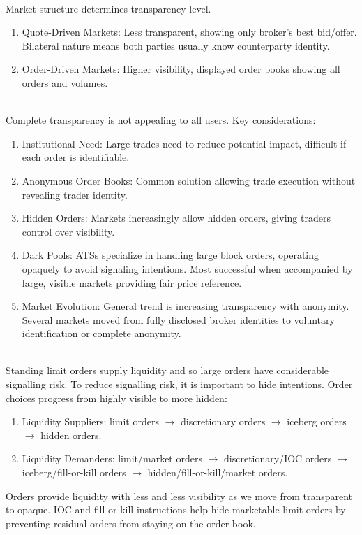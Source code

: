 \begin{remark} \\
Market structure determines transparency level.
\begin{enumerate}[label=\roman*.]
\setlength{\itemsep}{0pt}
\item Quote-Driven Markets: Less transparent, showing only broker's best bid/offer. Bilateral nature means both parties usually know counterparty identity.
\item Order-Driven Markets: Higher visibility, displayed order books showing all orders and volumes.
\end{enumerate}
\end{remark}

\begin{remark} \\
Complete transparency is not appealing to all users. Key considerations:
\begin{enumerate}[label=\roman*.]
\setlength{\itemsep}{0pt}
\item Institutional Need: Large trades need to reduce potential impact, difficult if each order is identifiable.
\item Anonymous Order Books: Common solution allowing trade execution without revealing trader identity.
\item Hidden Orders: Markets increasingly allow hidden orders, giving traders control over visibility.
\item Dark Pools: ATSs specialize in handling large block orders, operating opaquely to avoid signaling intentions. Most successful when accompanied by large, visible markets providing fair price reference.
\item Market Evolution: General trend is increasing transparency with anonymity. Several markets moved from fully disclosed broker identities to voluntary identification or complete anonymity.
\end{enumerate}
\end{remark}

\begin{remark} \\
Standing limit orders supply liquidity and so large orders have considerable signalling risk. To reduce signalling risk, it is important to hide intentions. Order choices progress from highly visible to more hidden:
\begin{enumerate}[label=\roman*.]
\setlength{\itemsep}{0pt}
\item Liquidity Suppliers: limit orders $\to$ discretionary orders $\to$ iceberg orders $\to$ hidden orders.
\item Liquidity Demanders: limit/market orders $\to$ discretionary/IOC orders $\to$ iceberg/fill-or-kill orders $\to$ hidden/fill-or-kill/market orders.
\end{enumerate}
Orders provide liquidity with less and less visibility as we move from transparent to opaque. IOC and fill-or-kill instructions help hide marketable limit orders by preventing residual orders from staying on the order book.
\end{remark}

